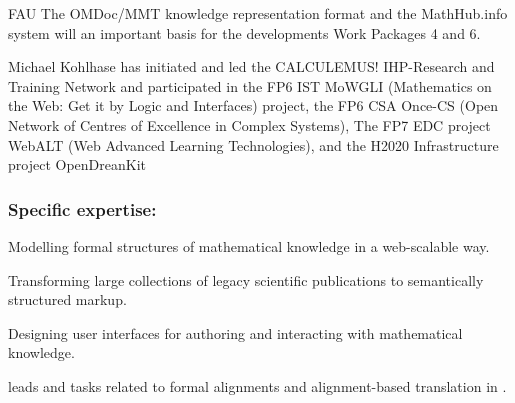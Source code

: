 \begin{sitedescription}{FAU}
The \textsf{OMDoc/MMT} knowledge representation format and the \textsf{MathHub.info}
system will an important basis for the developments Work Packages 4 and 6.

Michael Kohlhase has initiated and led the CALCULEMUS! IHP-Research and Training Network
and participated in the FP6 IST MoWGLI (Mathematics on the Web: Get it by Logic and
Interfaces) project, the FP6 CSA Once-CS (Open Network of Centres of Excellence in Complex
Systems), The FP7 EDC project WebALT (Web Advanced Learning Technologies), and the H2020
Infrastructure project OpenDreanKit

\subsubsection*{Specific expertise:}
\begin{compactitem}
\item Modelling formal structures of mathematical knowledge in a web-scalable way.
\item Transforming large collections of legacy scientific publications to semantically
  structured markup.
\item Designing user interfaces for authoring and interacting with mathematical knowledge.
\end{compactitem}

 leads  and tasks related to formal alignments and
alignment-based translation in .
\end{sitedescription}

